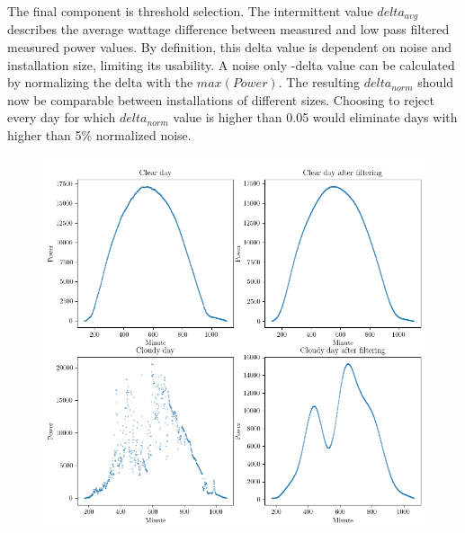 The final component is threshold selection. The intermittent value $delta_{avg}$ describes the average wattage difference between measured and low pass filtered measured power values. By definition, this delta value is dependent on noise and installation size, limiting its usability. A noise only -delta value can be calculated by normalizing the delta with the $max(Power)$. The resulting $delta_{norm}$ should now be comparable between installations of different sizes. Choosing to reject every day for which $delta_{norm}$ value is higher than 0.05 would eliminate days with higher than 5\% normalized noise.




\begin{figure}[h]
\centering
\includegraphics[width=0.8\linewidth]{pics/cloudfree_algo}
\label{fig_cloudfree_algo}
\end{figure}



\newpage









